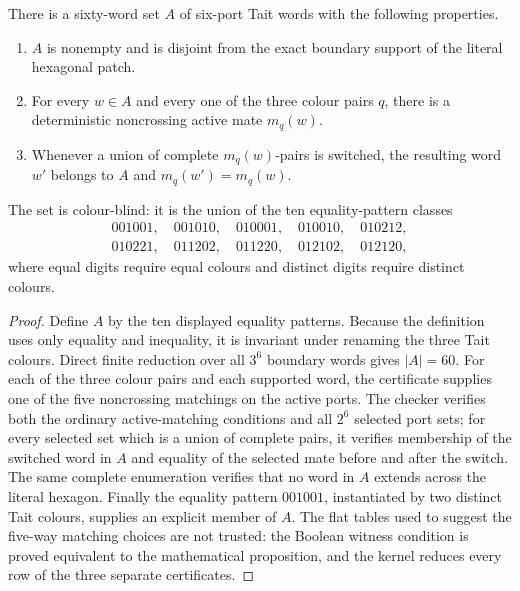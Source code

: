 \begin{proposition}
\label{prop:hexagon-persistent-pairwise-adversary}
There is a sixty-word set $A$ of six-port Tait words with the following
properties.
\begin{enumerate}
\item $A$ is nonempty and is disjoint from the exact boundary support of the
      literal hexagonal patch.
\item For every $w\in A$ and every one of the three colour pairs $q$, there is
      a deterministic noncrossing active mate $m_q(w)$.
\item Whenever a union of complete $m_q(w)$-pairs is switched, the resulting
      word $w'$ belongs to $A$ and $m_q(w')=m_q(w)$.
\end{enumerate}
The set is colour-blind: it is the union of the ten equality-pattern classes
\[
\begin{gathered}
001001,\quad001010,\quad010001,\quad010010,\quad010212,\\
010221,\quad011202,\quad011220,\quad012102,\quad012120,
\end{gathered}
\]
where equal digits require equal colours and distinct digits require distinct
colours.
\end{proposition}

\begin{proof}
Define $A$ by the ten displayed equality patterns.  Because the definition
uses only equality and inequality, it is invariant under renaming the three
Tait colours.  Direct finite reduction over all $3^6$ boundary words gives
$|A|=60$.  For each of the three colour pairs and each supported word, the
certificate supplies one of the five noncrossing matchings on the active
ports.  The checker verifies both the ordinary active-matching conditions and
all $2^6$ selected port sets; for every selected set which is a union of
complete pairs, it verifies membership of the switched word in $A$ and
equality of the selected mate before and after the switch.  The same complete
enumeration verifies that no word in $A$ extends across the literal hexagon.
Finally the equality pattern $001001$, instantiated by two distinct Tait
colours, supplies an explicit member of $A$.  The flat tables used to suggest
the five-way matching choices are not trusted: the Boolean witness condition
is proved equivalent to the mathematical proposition, and the kernel reduces
every row of the three separate certificates.
\end{proof}

